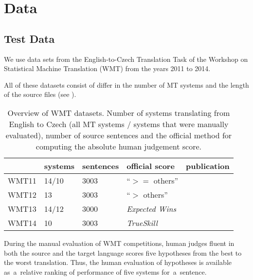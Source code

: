 \chapter{Data}

\section{Test Data}

We use data sets from the English-to-Czech Translation Task of the Workshop on
Statistical Machine Translation (WMT) from the years 2011 to 2014.

All of these datasets consist of  differ in the 
number of MT systems and the length of the source files (see ). 


\begin{table}[h]
\centering
\begin{tabular}{l|l|l|l|l}
      & systems & sentences & official score & publication\\
\hline
WMT11 & 14/10    & 3003      & “$ >= $ others”      & \cite{wmt11}  \\
WMT12 & 13          & 3003      & “$ > $ others”      & \cite{wmt12}  \\
WMT13 & 14/12    & 3000      & \textit{Expected Wins} & \cite{wmt13}  \\
WMT14 & 10          & 3003      & \textit{TrueSkill}   & \cite{wmt14}
\end{tabular}
\caption{Overview of WMT datasets. Number of systems translating from English 
to Czech (all MT systems / systems that were manually evaluated), number of 
source sentences and the official method for computing the absolute human 
judgement score.}
\label{wmt-data}
\end{table}

During the manual evaluation of WMT competitions, human judges fluent in both
the source and the target language scores five hypotheses from the best to
the worst translation. Thus, the human evaluation of hypotheses is available 
as~a~relative ranking of performance of five systems for~a~sentence. 

